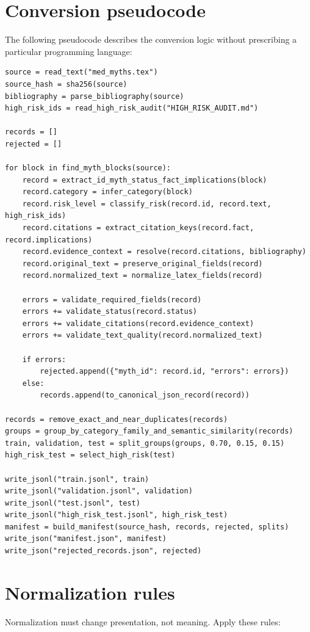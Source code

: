 \documentclass[11pt,oneside]{book}
\begin{document}
\section{Conversion pseudocode}

The following pseudocode describes the conversion logic without prescribing a particular programming language:

\begin{verbatim}
source = read_text("med_myths.tex")
source_hash = sha256(source)
bibliography = parse_bibliography(source)
high_risk_ids = read_high_risk_audit("HIGH_RISK_AUDIT.md")

records = []
rejected = []

for block in find_myth_blocks(source):
    record = extract_id_myth_status_fact_implications(block)
    record.category = infer_category(block)
    record.risk_level = classify_risk(record.id, record.text, high_risk_ids)
    record.citations = extract_citation_keys(record.fact, record.implications)
    record.evidence_context = resolve(record.citations, bibliography)
    record.original_text = preserve_original_fields(record)
    record.normalized_text = normalize_latex_fields(record)

    errors = validate_required_fields(record)
    errors += validate_status(record.status)
    errors += validate_citations(record.evidence_context)
    errors += validate_text_quality(record.normalized_text)

    if errors:
        rejected.append({"myth_id": record.id, "errors": errors})
    else:
        records.append(to_canonical_json_record(record))

records = remove_exact_and_near_duplicates(records)
groups = group_by_category_family_and_semantic_similarity(records)
train, validation, test = split_groups(groups, 0.70, 0.15, 0.15)
high_risk_test = select_high_risk(test)

write_jsonl("train.jsonl", train)
write_jsonl("validation.jsonl", validation)
write_jsonl("test.jsonl", test)
write_jsonl("high_risk_test.jsonl", high_risk_test)
manifest = build_manifest(source_hash, records, rejected, splits)
write_json("manifest.json", manifest)
write_json("rejected_records.json", rejected)
\end{verbatim}

\section{Normalization rules}

Normalization must change presentation, not meaning. Apply these rules:
\end{document}
